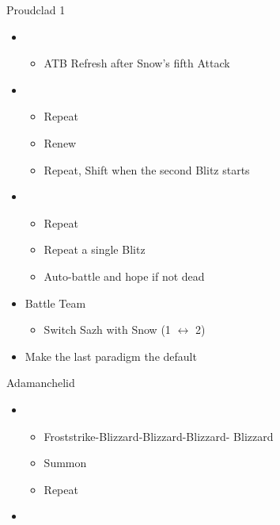\begin{multicols}{2}
\begin{battle}{Proudclad 1}
\begin{itemize}
\begin{itemize}
    \end{itemize}
    \item \first
    \begin{itemize}
        \item ATB Refresh after Snow's fifth Attack
    \end{itemize}
    \item \second
    \begin{itemize}
        \item Repeat
        \item Renew
        \item Repeat, Shift when the second Blitz starts
    \end{itemize}
    \item \first
    \begin{itemize}
        \item Repeat
        \item Repeat a single Blitz
        \item Auto-battle and hope if not dead
    \end{itemize}
\end{itemize}
\end{battle}
\begin{menu}
\begin{itemize}
    \paradigm
    \begin{itemize}
        \item Battle Team
        \begin{itemize}
            \item Switch Sazh with Snow (1 $\leftrightarrow$ 2)
        \end{itemize}
        \item Make the last paradigm the default
    \end{itemize}
\end{itemize}
\end{menu}
\vfill
\begin{battle}{Adamanchelid}
\begin{itemize}
    \item \sixth
    \begin{itemize}
        \item Froststrike-Blizzard-Blizzard-Blizzard- Blizzard
        \item Summon
        \item Repeat
    \end{itemize}
    \item \fifth
    \begin{itemize}

\end{itemize}
\end{itemize}
\end{battle}
\end{multicols}
